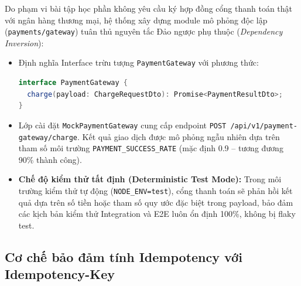 \documentclass[11pt, a4paper]{article}
\begin{document}
Do phạm vi bài tập học phần không yêu cầu ký hợp đồng cổng thanh toán thật với ngân hàng thương mại, hệ thống xây dựng module mô phỏng độc lập (\texttt{payments/gateway}) tuân thủ nguyên tắc Đảo ngược phụ thuộc (\textit{Dependency Inversion}):
\begin{itemize}
	\item Định nghĩa Interface trừu tượng \texttt{PaymentGateway} với phương thức:
	      \begin{lstlisting}[language=Java]
interface PaymentGateway {
  charge(payload: ChargeRequestDto): Promise<PaymentResultDto>;
}
  \end{lstlisting}
	\item Lớp cài đặt \texttt{MockPaymentGateway} cung cấp endpoint \texttt{POST /api/v1/payment-gateway/charge}. Kết quả giao dịch được mô phỏng ngẫu nhiên dựa trên tham số môi trường \texttt{PAYMENT\_SUCCESS\_RATE} (mặc định 0.9 -- tương đương 90\% thành công).
	\item \textbf{Chế độ kiểm thử tất định (Deterministic Test Mode):} Trong môi trường kiểm thử tự động (\texttt{NODE\_ENV=test}), cổng thanh toán sẽ phản hồi kết quả dựa trên số tiền hoặc tham số quy ước đặc biệt trong payload, bảo đảm các kịch bản kiểm thử Integration và E2E luôn ổn định 100\%, không bị flaky test.
\end{itemize}

\subsection{Cơ chế bảo đảm tính Idempotency với Idempotency-Key}
\end{document}
